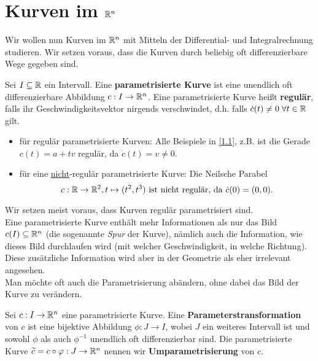 \documentclass[11pt]{scrbook}
\begin{document}
\section{Kurven im $\mathbb{R}^n$}
Wir wollen nun Kurven im $\mathbb{R}^n$ mit Mitteln der Differential- und Integralrechnung studieren. Wir setzen voraus, dass die Kurven durch beliebig oft differenzierbare Wege gegeben sind.

\begin{df}
Sei $I \subseteq \mathbb{R}$ ein Intervall. Eine \textbf{parametrisierte Kurve} ist eine unendlich oft differenzierbare Abbildung $c: I \to \mathbb{R}^n$. Eine parametrisierte Kurve heißt \textbf{regulär}, falls ihr Geschwindigkeitsvektor nirgends verschwindet, d.h. falls $\dot c (t) \neq 0 \; \forall t \in \mathbb{R}$ gilt.
\end{df}

\begin{ex*}
\begin{itemize}
	\item für regulär parametrisierte Kurven: Alle Beispiele in \ref{1.1}, z.B. ist die Gerade $c(t) = a+tv$ regulär, da $\dot c(t) = v \neq 0$.
	\item  für eine \underline{nicht}-regulär parametrisierte Kurve: Die Neilsche Parabel \[ c:\mathbb{R} \to \mathbb{R}^2, t \mapsto (t^2, t^3) \text{ ist nicht regulär, da } \dot c(0) = (0,0). \]
\end{itemize}
\end{ex*}

\begin{note}
Wir setzen meist voraus, dass Kurven regulär parametrisiert sind. \\
Eine parametrisierte Kurve enthält mehr Informationen als nur das Bild $c(I) \subseteq \mathbb{R}^n$ (die sogenannte \emph{Spur} der Kurve), nämlich auch die Information, wie dieses Bild durchlaufen wird (mit welcher Geschwindigkeit, in welche Richtung). Diese zusätzliche Information wird aber in der Geometrie als eher irrelevant angesehen. \\
Man möchte oft auch die Parametrisierung abändern, ohne dabei das Bild der Kurve zu verändern.
\end{note}

\begin{df}
Sei $c: I \to \mathbb{R}^n$ eine parametrisierte Kurve. Eine \textbf{Parameterstransformation} von $c$ ist eine bijektive Abbildung $\phi: J \to I$, wobei $J$ ein weiteres Intervall ist und sowohl $\phi$ als auch $\phi^{-1}$ unendlich oft differenzierbar sind. Die parametrisierte Kurve $\widetilde c = c \circ \varphi : J \to \mathbb{R}^n$ nennen wir \textbf{Umparametrisierung} von $c$. 
\end{df}
\end{document}
